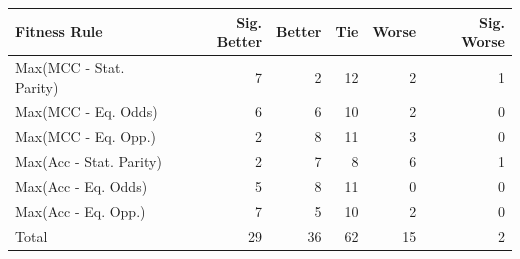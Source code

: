 \begin{tabular}{lrrrrr}
\toprule
Fitness Rule & Sig. Better & Better & Tie & Worse & Sig. Worse \\
\midrule
Max(MCC - Stat. Parity) & 7 & 2 & 12 & 2 & 1 \\
Max(MCC - Eq. Odds) & 6 & 6 & 10 & 2 & 0 \\
Max(MCC - Eq. Opp.) & 2 & 8 & 11 & 3 & 0 \\
Max(Acc - Stat. Parity) & 2 & 7 & 8 & 6 & 1 \\
Max(Acc - Eq. Odds) & 5 & 8 & 11 & 0 & 0 \\
Max(Acc - Eq. Opp.) & 7 & 5 & 10 & 2 & 0 \\
Total & 29 & 36 & 62 & 15 & 2 \\
\bottomrule
\end{tabular}
